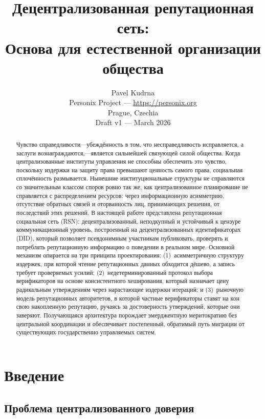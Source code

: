 \documentclass[11pt,a4paper,twocolumn]{article}
\title{\textbf{Децентрализованная репутационная сеть:\\Основа для естественной организации общества}}
\author{Pavel Kudrna\\Personix Project --- \url{https://personix.org}\\Prague, Czechia\\Draft v1 --- March 2026}
\date{}
\begin{document}
\maketitle

\begin{abstract}
Чувство справедливости---убеждённость в том, что несправедливость исправляется, а заслуги вознаграждаются,---является сильнейшей связующей силой общества. Когда централизованные институты управления не способны обеспечить это чувство, поскольку издержки на защиту права превышают ценность самого права, социальная сплочённость размывается. Нынешние институциональные структуры не справляются со значительным классом споров ровно так же, как централизованное планирование не справляется с распределением ресурсов: через информационную асимметрию, отсутствие обратных связей и оторванность лиц, принимающих решения, от последствий этих решений. В настоящей работе представлена репутационная социальная сеть (RSN): децентрализованный, неподкупный и устойчивый к цензуре коммуникационный уровень, построенный на децентрализованных идентификаторах (DID), который позволяет псевдонимным участникам публиковать, проверять и потреблять репутационную информацию о поведении в реальном мире. Основной механизм опирается на три принципа проектирования: (1)~асимметричную структуру издержек, при которой чтение репутационных данных обходится дёшево, а запись требует проверяемых усилий; (2)~недетерминированный протокол выбора верификаторов на основе консистентного хеширования, который назначает цену радикальным утверждениям через нарастающие издержки итераций; и (3)~рыночную модель репутационных авторитетов, в которой частные верификаторы ставят на кон свою накопленную репутацию, ручаясь за достоверность утверждений, которые они заверяют. Получающаяся архитектура порождает эмерджентную меритократию без центральной координации и обеспечивает постепенный, обратимый путь миграции от существующих государственно управляемых систем.
\end{abstract}

\section{Введение}

\subsection{Проблема централизованного доверия}
\end{document}
